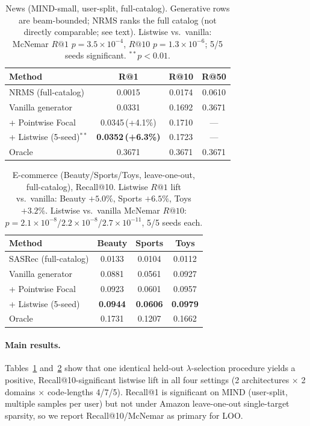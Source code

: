 \documentclass[sigconf,anonymous,review]{acmart}
\begin{document}
\begin{table}[t]
  \caption{News (MIND-small, user-split, full-catalog). Generative rows are beam-bounded; NRMS ranks
  the full catalog (not directly comparable; see text). Listwise vs.\ vanilla: McNemar $R@1$
  $p{=}3.5{\times}10^{-4}$, $R@10$ $p{=}1.3{\times}10^{-6}$; 5/5 seeds significant. $^{**}p<0.01$.}
  \label{tab:news}
  \begin{tabular}{lccc}
    \toprule
    Method & R@1 & R@10 & R@50 \\
    \midrule
    NRMS (full-catalog) & 0.0015 & 0.0174 & 0.0610 \\
    Vanilla generator & 0.0331 & 0.1692 & 0.3671 \\
    \quad + Pointwise Focal & 0.0345\,(+4.1\%) & 0.1710 & --- \\
    \quad + Listwise (5-seed)$^{**}$ & \textbf{0.0352\,(+6.3\%)} & 0.1723 & --- \\
    Oracle & 0.3671 & 0.3671 & 0.3671 \\
    \bottomrule
  \end{tabular}
\end{table}

\begin{table}[t]
  \caption{E-commerce (Beauty/Sports/Toys, leave-one-out, full-catalog), Recall@10. Listwise $R@1$
  lift vs.\ vanilla: Beauty $+5.0\%$, Sports $+6.5\%$, Toys $+3.2\%$. Listwise vs.\ vanilla McNemar
  $R@10$: $p{=}2.1{\times}10^{-8}$/$2.2{\times}10^{-8}$/$2.7{\times}10^{-11}$, 5/5 seeds each.}
  \label{tab:ecom}
  \begin{tabular}{lccc}
    \toprule
    Method & Beauty & Sports & Toys \\
    \midrule
    SASRec (full-catalog) & 0.0133 & 0.0104 & 0.0112 \\
    Vanilla generator & 0.0881 & 0.0561 & 0.0927 \\
    \quad + Pointwise Focal & 0.0923 & 0.0601 & 0.0957 \\
    \quad + Listwise (5-seed) & \textbf{0.0944} & \textbf{0.0606} & \textbf{0.0979} \\
    Oracle & 0.1731 & 0.1207 & 0.1662 \\
    \bottomrule
  \end{tabular}
\end{table}

\paragraph{Main results.} Tables~\ref{tab:news} and~\ref{tab:ecom} show that one identical
held-out $\lambda$-selection procedure yields a positive, Recall@10-significant listwise lift in all four settings
(2 architectures $\times$ 2 domains $\times$ code-lengths 4/7/5). Recall@1 is significant on MIND
(user-split, multiple samples per user) but not under Amazon leave-one-out single-target sparsity, so
we report Recall@10/McNemar as primary for LOO.
\end{document}
